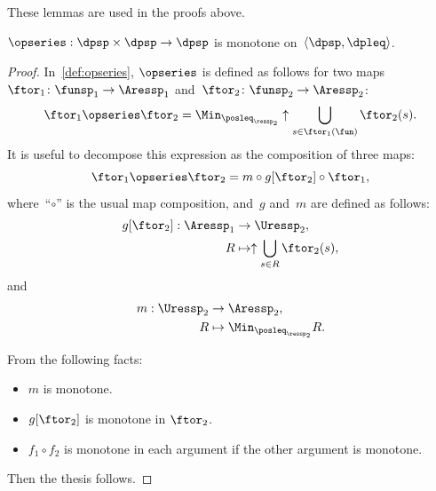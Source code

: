 These lemmas are used in the proofs above.
\begin{lemma}
    \label{lem:series-monotone}$\opseries:\dpsp\times\dpsp\rightarrow\dpsp$
    is monotone on~$\langle\dpsp,\dpleq\rangle$.
\end{lemma}
\begin{proof}
    In~\cref{def:opseries}, $\opseries$ is defined as follows
    for two maps~$\ftor_{1}\colon\funsp_{1}\rightarrow\Aressp_{1}$ and~$\ftor_{2}\colon\funsp_{2}\rightarrow\Aressp_{2}$:
    \[
            {\displaystyle \ftor_{1}\opseries\ftor_{2}=\Min_{\posleq_{\ressp_{2}}}\uparrow\bigcup_{s\in\ftor_{1}(\fun)}\ftor_{2}(s)}.
    \]
    It is useful to decompose this expression as the composition of three
    maps:
    \[
        \ftor_{1}\opseries\ftor_{2}=m\circ g[\ftor_{2}]\circ\ftor_{1},
    \]
    where~``$\circ$'' is the usual map composition, and~$g$ and~$m$
    are defined as follows:
    \begin{align*}
        g[\ftor_{2}]:\Aressp_{1} & \rightarrow\Uressp_{2},\\
        R & \mapsto\uparrow\bigcup_{s\in R}\ftor_{2}(s),
    \end{align*}
    and
    \begin{align*}
        m:\Uressp_{2} & \to \Aressp_{2},\\
        R & \mapsto\Min_{\posleq_{\ressp_{2}}}R.
    \end{align*}

    From the following facts:
    \begin{itemize}
        \item $m$ is monotone.
        \item $g[\ftor_{2}]$ is monotone in $\ftor_{2}$.
        \item $f_{1}\circ f_{2}$ is monotone in each argument if the other argument
        is monotone.
    \end{itemize}
    Then the thesis follows.
\end{proof}

